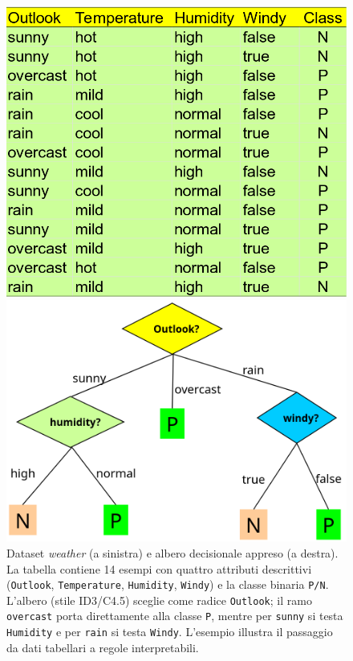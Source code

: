 \begin{figure}[htbp]
  \centering
  \begin{minipage}[t]{.50\textwidth}
    \centering
    \includegraphics[width=\linewidth]{images/weather_table.png}
  \end{minipage}\hfill
  \begin{minipage}[t]{.48\textwidth}
    \centering
    \includegraphics[width=\linewidth]{images/decision_tree_weather.png}
  \end{minipage}
  \caption{Dataset \emph{weather} (a sinistra) e albero decisionale appreso (a destra). 
  La tabella contiene 14 esempi con quattro attributi descrittivi (\texttt{Outlook}, \texttt{Temperature}, 
  \texttt{Humidity}, \texttt{Windy}) e la classe binaria \texttt{P/N}. 
  L’albero (stile ID3/C4.5) sceglie come radice \texttt{Outlook}; il ramo \texttt{overcast} porta 
  direttamente alla classe \texttt{P}, mentre per \texttt{sunny} si testa \texttt{Humidity} e per \texttt{rain} 
  si testa \texttt{Windy}. L’esempio illustra il passaggio da dati tabellari a regole interpretabili.}
  \label{fig:weather-tree}
\end{figure}

